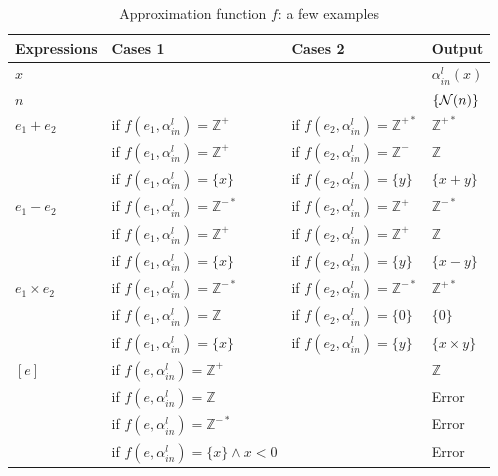\begin{table}
	\centering
	\begin{tabular}{@{}p{}p{}p{}p{}@{}}
	\toprule
	Expressions & Cases 1 & Cases 2 & Output \\
	\midrule
	$x$ & & & $\alpha_{in}^l(x)$ \\
	\midrule
	$n$ & & & $\lbrace \mathcal{N}{}(n) \rbrace$ \\
	\midrule
	$e_1 + e_2$ & if $f(e_1, \alpha_{in}^l) = \mathbb{Z}^{+}$ & if $f(e_2, \alpha_{in}^l) = \mathbb{Z}^{+*}$ & $\mathbb{Z}^{+*}$ \\
	& if $f(e_1, \alpha_{in}^l) = \mathbb{Z}^{+}$ & if $f(e_2, \alpha_{in}^l) = \mathbb{Z}^{-}$ & $\mathbb{Z}$ \\
	& if $f(e_1, \alpha_{in}^l) = \lbrace x \rbrace$ & if $f(e_2, \alpha_{in}^l) = \lbrace y \rbrace$ & $\lbrace x + y \rbrace$ \\
	\midrule
	$e_1 - e_2$ & if $f(e_1, \alpha_{in}^l) = \mathbb{Z}^{-*}$ & if $f(e_2, \alpha_{in}^l) = \mathbb{Z}^{+}$ & $\mathbb{Z}^{-*}$ \\
	& if $f(e_1, \alpha_{in}^l) = \mathbb{Z}^{+}$ & if $f(e_2, \alpha_{in}^l) = \mathbb{Z}^{+}$ & $\mathbb{Z}$ \\
	& if $f(e_1, \alpha_{in}^l) = \lbrace x \rbrace$ & if $f(e_2, \alpha_{in}^l) = \lbrace y \rbrace$ & $\lbrace x - y \rbrace$ \\
	\midrule
	$e_1 \times e_2$ & if $f(e_1, \alpha_{in}^l) = \mathbb{Z}^{-*}$ & if $f(e_2, \alpha_{in}^l) = \mathbb{Z}^{-*}$ & $\mathbb{Z}^{+*}$ \\
	& if $f(e_1, \alpha_{in}^l) = \mathbb{Z}$ & if $f(e_2, \alpha_{in}^l) = \lbrace 0 \rbrace$ & $\lbrace 0 \rbrace$ \\
	& if $f(e_1, \alpha_{in}^l) = \lbrace x \rbrace$ & if $f(e_2, \alpha_{in}^l) = \lbrace y \rbrace$ & $\lbrace x \times y \rbrace$ \\
	\midrule
	$[e]$ & if $f(e, \alpha_{in}^l) = \mathbb{Z}^{+}$ & & $\mathbb{Z}$ \\
	& if $f(e, \alpha_{in}^l) = \mathbb{Z}$ & & Error \\
	& if $f(e, \alpha_{in}^l) = \mathbb{Z}^{-*}$ & & Error \\
	& if $f(e, \alpha_{in}^l) = \lbrace x \rbrace \wedge x < 0$ & & Error \\
	\bottomrule
	\end{tabular}
	\caption{Approximation function $f$: a few examples}
	\label{tab:approx}
\end{table}


